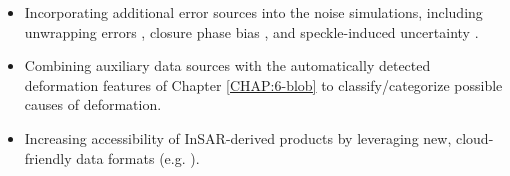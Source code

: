 \begin{itemize}
\item Incorporating additional error sources into the noise simulations, including unwrapping errors \citep{Yunjun2019SmallBaselineInsar}, closure phase bias \citep{Zheng2022ClosurePhaseSystematic}, and speckle-induced uncertainty \citep{Zwieback2022ReliableInsarPhase}. 

\item Combining auxiliary data sources with the automatically detected deformation features of Chapter \ref{CHAP:6-blob} to classify/categorize possible causes of deformation.

\item Increasing accessibility of InSAR-derived products by leveraging new, cloud-friendly data formats (e.g. \cite{Kellndorfer2022GlobalSeasonalSentinel}).


\end{itemize}

